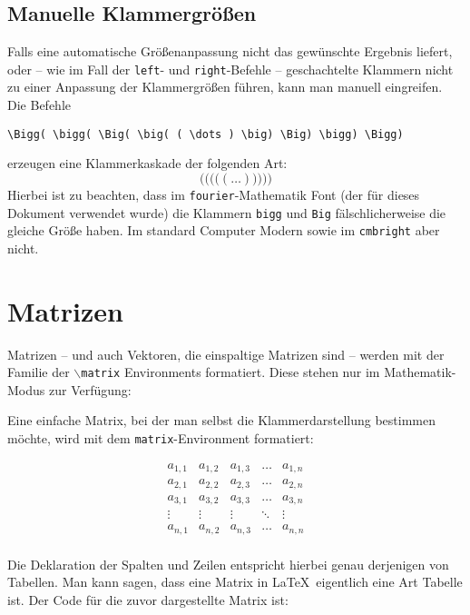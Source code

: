\subsection{Manuelle Klammergrößen}
Falls eine automatische Größenanpassung nicht das gewünschte Ergebnis liefert, oder -- wie im Fall der \texttt{left}- und \texttt{right}-Befehle -- geschachtelte Klammern nicht zu einer Anpassung der Klammergrößen führen, kann man manuell eingreifen. Die Befehle 
\begin{verbatim}
\Bigg( \bigg( \Big( \big( ( \dots ) \big) \Big) \bigg) \Bigg)
\end{verbatim}
erzeugen eine Klammerkaskade der folgenden Art:
\begin{equation*}
\Bigg( \bigg( \Big( \big( ( \dots ) \big) \Big) \bigg) \Bigg)
\end{equation*}
Hierbei ist zu beachten, dass im \texttt{fourier}-Mathematik Font (der für dieses Dokument verwendet wurde) die Klammern \texttt{bigg} und \texttt{Big} fälschlicherweise die gleiche Größe haben. Im standard Computer Modern sowie im \texttt{cmbright} aber nicht. 

\section{Matrizen}

Matrizen -- und auch Vektoren, die einspaltige Matrizen sind -- werden mit der Familie der  \texttt{$\backslash$matrix} Environments formatiert. Diese stehen nur im Mathematik-Modus zur Verfügung:

Eine einfache Matrix, bei der man selbst die Klammerdarstellung bestimmen möchte, wird mit dem \texttt{matrix}-Environment formatiert:

\begin{equation*}
\begin{matrix}
a_{1,1} & a_{1,2} & a_{1,3} & \dots & a_{1,n} \\
a_{2,1} & a_{2,2} & a_{2,3} & \dots & a_{2,n} \\
a_{3,1} & a_{3,2} & a_{3,3} & \dots & a_{3,n} \\
\vdots & \vdots & \vdots & \ddots & \vdots \\
a_{n,1} & a_{n,2} & a_{n,3} & \dots & a_{n,n} \\
\end{matrix}
\end{equation*}

Die Deklaration der Spalten und Zeilen entspricht hierbei genau derjenigen von Tabellen. Man kann sagen, dass eine Matrix in \LaTeX\ eigentlich eine Art Tabelle ist. Der Code für die zuvor dargestellte Matrix ist:

